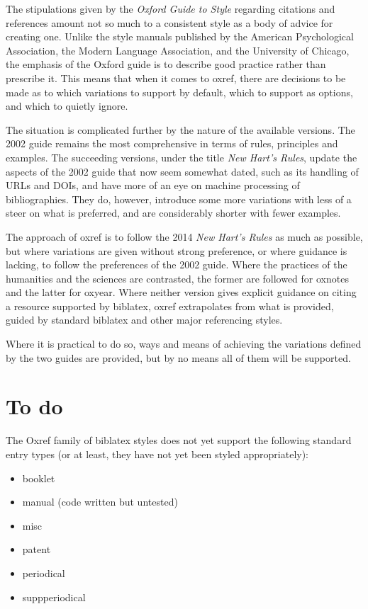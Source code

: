 \documentclass[extrafontsizes,11pt,a4paper,oneside]{memoir}
\begin{document}
The stipulations given by the \emph{Oxford Guide to Style} regarding citations and references
amount not so much to a consistent style as a body of advice for creating one.
Unlike the style manuals published by the American Psychological Association,
the Modern Language Association, and the University of Chicago,
the emphasis of the Oxford guide is to describe good practice rather than prescribe it.
This means that when it comes to \textsf{oxref}, there are decisions to be made
as to which variations to support by default, which to support as options,
and which to quietly ignore.

The situation is complicated further by the nature of the available versions.
The 2002 guide remains the most comprehensive in terms of rules, principles and examples.
The succeeding versions, under the title \emph{New Hart's Rules},
update the aspects of the 2002 guide that now seem somewhat dated,
such as its handling of URLs and DOIs,
and have more of an eye on machine processing of bibliographies.
They do, however, introduce some more variations with less of a steer on what is preferred,
and are considerably shorter with fewer examples.

The approach of \textsf{oxref} is to follow the 2014 \emph{New Hart's Rules} as much as possible,
but where variations are given without strong preference, or where guidance is lacking,
to follow the preferences of the 2002 guide.
Where the practices of the humanities and the sciences are contrasted,
the former are followed for \textsf{oxnotes} and the latter for \textsf{oxyear}.
Where neither version gives explicit guidance on citing a resource supported by \textsf{biblatex},
\textsf{oxref} extrapolates from what is provided, guided by standard \textsf{biblatex}
and other major referencing styles.

Where it is practical to do so,
ways and means of achieving the variations defined by the two guides are provided,
but by no means all of them will be supported.

\section{To do}

The Oxref family of \textsf{biblatex} styles does not yet support the following standard entry types
(or at least, they have not yet been styled appropriately):

\begin{multicols}{2}
  \begin{itemize}\firmlist
    \item booklet
    \item manual (code written but untested)
    \item misc
    \item patent
    \item periodical
    \item suppperiodical
  \end{itemize}
\end{multicols}
\end{document}
